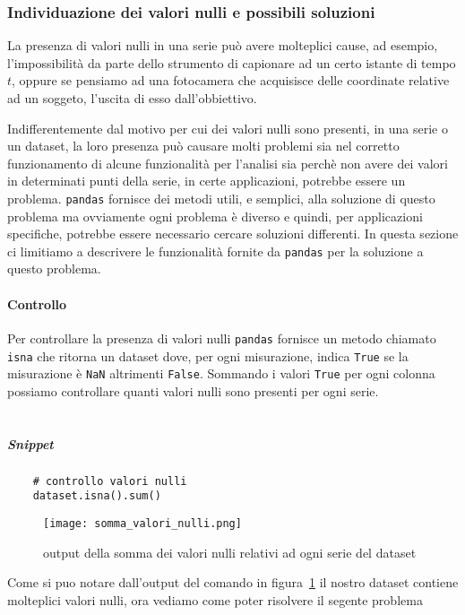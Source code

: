 \subsubsection{Individuazione dei valori nulli e possibili soluzioni}
La presenza di valori nulli in una serie può avere molteplici cause, ad esempio,
l'impossibilità da parte dello strumento di capionare ad un certo istante di tempo $t$,
oppure se pensiamo ad una fotocamera che acquisisce delle coordinate relative ad un soggeto,
l'uscita di esso dall'obbiettivo.

Indifferentemente dal motivo per cui dei valori nulli sono presenti, 
in una serie o un dataset, la loro presenza può causare molti
problemi sia nel corretto funzionamento di alcune funzionalità per l'analisi sia perchè
non avere dei valori in determinati punti della serie, in certe applicazioni, potrebbe
essere un problema. \texttt{pandas} fornisce dei metodi utili, e semplici, alla soluzione di questo
problema ma ovviamente ogni problema è diverso e quindi, per applicazioni specifiche,
potrebbe essere necessario cercare soluzioni differenti. In questa sezione ci limitiamo
a descrivere le funzionalità fornite da \texttt{pandas} per la soluzione a questo problema.

\paragraph{Controllo}
Per controllare la presenza di valori nulli \texttt{pandas} fornisce un metodo chiamato
\texttt{isna} che ritorna un dataset dove, per ogni misurazione, indica \texttt{True}
se la misurazione è \texttt{NaN} altrimenti \texttt{False}. Sommando i valori \texttt{True}
per ogni colonna possiamo controllare quanti valori nulli sono presenti per ogni serie.\\
\\
\subparagraph*{Snippet}
\begin{verbatim}
    # controllo valori nulli
    dataset.isna().sum()
\end{verbatim}
\begin{figure}[h!]
    \centering
    \texttt{[image: somma\_valori\_nulli.png]}
    \caption{output della somma dei valori nulli relativi ad ogni serie del dataset}
    \label{fig:sum_null}
\end{figure}
Come si puo notare dall'output del comando in figura~\ref*{fig:sum_null}
il nostro dataset contiene molteplici valori nulli, ora vediamo come poter risolvere
il segente problema

